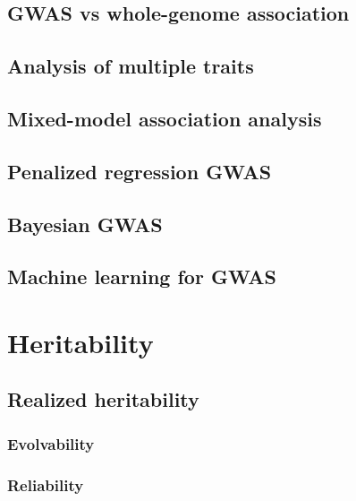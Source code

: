 \documentclass[]{book}
\theoremstyle{definition}
\theoremstyle{definition}
\theoremstyle{definition}
\theoremstyle{remark}
\begin{document}
\section{GWAS vs whole-genome
association}\label{gwas-vs-whole-genome-association}

\section{Analysis of multiple traits}\label{analysis-of-multiple-traits}

\section{Mixed-model association
analysis}\label{mixed-model-association-analysis}

\section{Penalized regression GWAS}\label{penalized-regression-gwas}

\section{Bayesian GWAS}\label{bayesian-gwas}

\section{Machine learning for GWAS}\label{machine-learning-for-gwas}

\chapter{Heritability}\label{heritability}

\section{Realized heritability}\label{realized-heritability}

\subsection{Evolvability}\label{evolvability}

\subsection{Reliability}\label{reliability}
\end{document}
